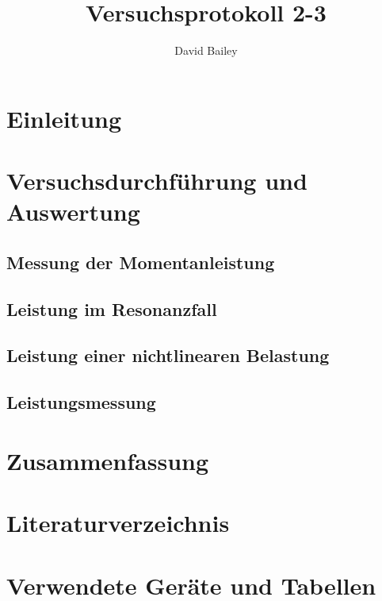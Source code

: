 \documentclass[11pt,a4paper]{article}
\author{David Bailey}
\title{Versuchsprotokoll 2-3}
\numberwithin{equation}{subsection}
\begin{document}



\tableofcontents

\newpage

\section{Einleitung}


\section{Versuchsdurchführung und Auswertung}
\subsection{Messung der Momentanleistung}


\subsection{Leistung im Resonanzfall}


\subsection{Leistung einer nichtlinearen Belastung}


\subsection{Leistungsmessung}


\newpage
\section{Zusammenfassung}


\newpage

\setcounter{section}{0}
\renewcommand{\thesection}{\Alph{section}}
\section{Literaturverzeichnis}
\printbibliography
\newpage
\section{Verwendete Geräte und Tabellen}
\end{document}
